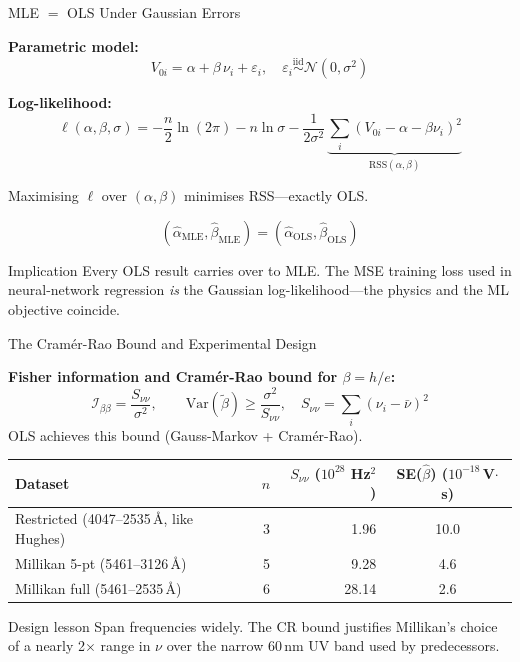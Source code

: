 \documentclass[aspectratio=169,12pt]{beamer}
\begin{document}
\begin{frame}[shrink=12]{MLE $=$ OLS Under Gaussian Errors}

\textbf{Parametric model:}
\[
  V_{0i} = \alpha + \beta\,\nu_i + \varepsilon_i,
  \quad
  \varepsilon_i \overset{\text{iid}}{\sim} \mathcal{N}(0,\sigma^2)
\]

\textbf{Log-likelihood:}
\[
  \ell(\alpha,\beta,\sigma) =
  -\frac{n}{2}\ln(2\pi) - n\ln\sigma
  - \frac{1}{2\sigma^2}\,\underbrace{\sum_{i}(V_{0i}-\alpha-\beta\nu_i)^2}_{\text{RSS}(\alpha,\beta)}
\]

\bigskip
Maximising $\ell$ over $(\alpha,\beta)$ minimises RSS---exactly OLS.

\[
  \boxed{(\hat\alpha_{\mathrm{MLE}},\hat\beta_{\mathrm{MLE}}) =
         (\hat\alpha_{\mathrm{OLS}},\hat\beta_{\mathrm{OLS}})}
\]

\bigskip
\begin{block}{Implication}
Every OLS result carries over to MLE.
The MSE training loss used in neural-network regression \emph{is} the
Gaussian log-likelihood---the physics and the ML objective coincide.
\end{block}

\end{frame}

\begin{frame}[shrink=20]{The Cram\'er-Rao Bound and Experimental Design}

\textbf{Fisher information and Cram\'er-Rao bound for $\beta = h/e$:}
\[
  \mathcal{I}_{\beta\beta} = \frac{S_{\nu\nu}}{\sigma^2},
  \qquad
  \mathrm{Var}(\tilde\beta) \geq \frac{\sigma^2}{S_{\nu\nu}},
  \quad S_{\nu\nu} = \textstyle\sum_i(\nu_i - \bar\nu)^2
\]
OLS achieves this bound (Gauss-Markov + Cram\'er-Rao).

\medskip
\begin{center}
\small
\begin{tabular}{lrrc}
\toprule
Dataset & $n$ & $S_{\nu\nu}$ ($10^{28}$ Hz$^2$) & SE($\hat\beta$) ($10^{-18}$\,V$\cdot$s) \\
\midrule
Restricted (4047--2535\,\AA, like Hughes) & 3 & 1.96  & 10.0 \\
Millikan 5-pt (5461--3126\,\AA)           & 5 & 9.28  & 4.6  \\
Millikan full (5461--2535\,\AA)           & 6 & 28.14 & 2.6  \\
\bottomrule
\end{tabular}
\end{center}

\smallskip
\begin{block}{Design lesson}
Span frequencies widely.  The CR bound justifies Millikan's choice of
a nearly 2$\times$ range in $\nu$ over the narrow 60\,nm UV band used by predecessors.
\end{block}

\end{frame}
\end{document}

